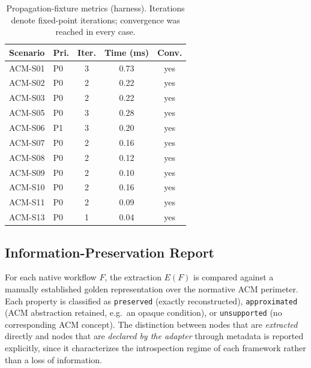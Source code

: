 \documentclass[10pt]{article}
\begin{document}
\begin{table}[htbp]
	\centering
	\caption{Propagation-fixture metrics (harness). Iterations denote
		fixed-point iterations; convergence was reached in every case.}
	\label{tab:app-eval-fixtures}
	\small
	\begin{tabular}{@{}llccc@{}}
		\toprule
		\textbf{Scenario} & \textbf{Pri.} & \textbf{Iter.} & \textbf{Time (ms)} & \textbf{Conv.} \\
		\midrule
		ACM-S01 & P0 & 3 & 0.73 & yes \\
		ACM-S02 & P0 & 2 & 0.22 & yes \\
		ACM-S03 & P0 & 2 & 0.22 & yes \\
		ACM-S05 & P0 & 3 & 0.28 & yes \\
		ACM-S06 & P1 & 3 & 0.20 & yes \\
		ACM-S07 & P0 & 2 & 0.16 & yes \\
		ACM-S08 & P0 & 2 & 0.12 & yes \\
		ACM-S09 & P0 & 2 & 0.10 & yes \\
		ACM-S10 & P0 & 2 & 0.16 & yes \\
		ACM-S11 & P0 & 2 & 0.09 & yes \\
		ACM-S13 & P0 & 1 & 0.04 & yes \\
		\bottomrule
	\end{tabular}
\end{table}

\subsection{Information-Preservation Report}
\label{app:report-preservation}

For each native workflow $F$, the extraction $E(F)$ is compared against a
manually established golden representation over the normative ACM
perimeter. Each property is classified as \texttt{preserved} (exactly
reconstructed), \texttt{approximated} (ACM abstraction retained, e.g.\ an
opaque condition), or \texttt{unsupported} (no corresponding ACM concept).
The distinction between nodes that are \emph{extracted} directly and
nodes that are \emph{declared by the adapter} through metadata is
reported explicitly, since it characterizes the introspection regime of
each framework rather than a loss of information.
\end{document}
